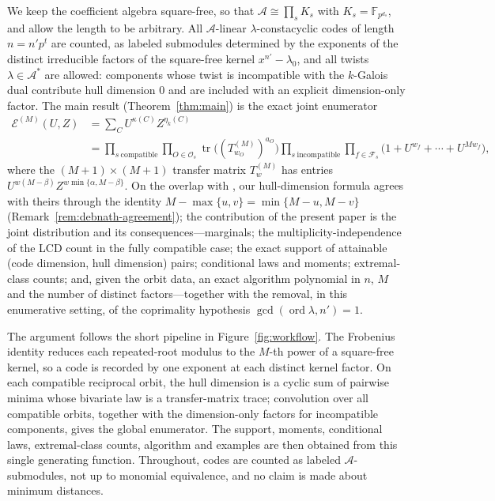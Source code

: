 \documentclass[11pt,a4paper]{article}
\newcommand{\F}{\mathbb F}
\newcommand{\A}{\mathcal A}
\newcommand{\Fs}{\mathcal F_s}
\newcommand{\Os}{\mathcal O_s}
\newcommand{\Epoly}{\mathscr E}
\numberwithin{equation}{section}
\theoremstyle{plain}
\theoremstyle{definition}
\theoremstyle{remark}
\begin{document}
We keep the coefficient algebra square-free, so that
$\A\cong\prod_s K_s$ with $K_s=\F_{p^{d_s}}$, and allow the length to be
arbitrary. All $\A$-linear $\lambda$-constacyclic codes of length $n=n'p^t$
are counted, as labeled submodules determined by the exponents of the
distinct irreducible factors of the square-free kernel $x^{n'}-\lambda_0$, and
all twists $\lambda\in\A^\ast$ are allowed: components whose twist is
incompatible with the $k$-Galois dual contribute hull dimension $0$ and are
included with an explicit dimension-only factor. The main result
(Theorem~\ref{thm:main}) is the exact joint enumerator
\begin{align*}
  \Epoly^{(M)}(U,Z)
  &=\sum_{C} U^{\kappa(C)} Z^{\eta_k(C)}\\
  &=\prod_{s\ \mathrm{compatible}}\prod_{O\in\Os}
     \operatorname{tr}\!\bigl((T^{(M)}_{w_O})^{a_O}\bigr)
   \prod_{s\ \mathrm{incompatible}}\prod_{f\in\Fs}
     \bigl(1+U^{w_f}+\cdots+U^{Mw_f}\bigr),
\end{align*}
where the $(M+1)\times(M+1)$ transfer matrix $T^{(M)}_w$ has entries
$U^{w(M-\beta)}Z^{w\min\{\alpha,M-\beta\}}$. On the overlap with
\cite{debnathAffine2026}, our hull-dimension formula agrees with theirs
through the identity $M-\max\{u,v\}=\min\{M-u,M-v\}$
(Remark~\ref{rem:debnath-agreement}); the contribution of the present paper
is the joint distribution and its consequences---marginals; the
multiplicity-independence of the LCD count in the fully compatible case;
the exact support of attainable (code dimension, hull dimension) pairs;
conditional laws and moments; extremal-class counts; and, given the orbit
data, an exact algorithm polynomial in $n$, $M$ and the number of distinct
factors---together
with the removal, in this enumerative setting, of the coprimality hypothesis
$\gcd(\operatorname{ord}\lambda,n')=1$.


The argument follows the short pipeline in Figure~\ref{fig:workflow}. The Frobenius identity reduces each
repeated-root modulus to the $M$-th power of a square-free kernel, so a code
is recorded by one exponent at each distinct kernel factor. On each
compatible reciprocal orbit, the hull dimension is a cyclic sum of pairwise
minima whose bivariate law is a transfer-matrix trace; convolution over all
compatible orbits, together with the dimension-only factors for incompatible
components, gives the global enumerator. The support, moments, conditional
laws, extremal-class counts, algorithm and examples are then obtained from
this single generating function. Throughout, codes are counted as labeled
$\A$-submodules, not up to monomial equivalence, and no claim is made about
minimum distances.
\end{document}
